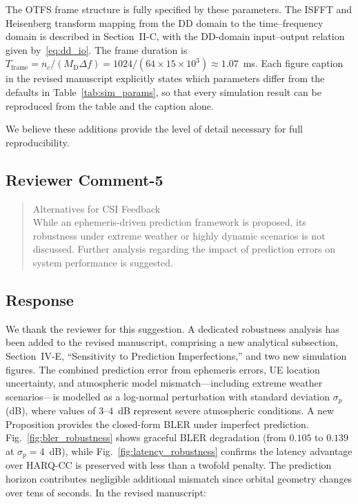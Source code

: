 The OTFS frame structure is fully specified by these parameters. The ISFFT and Heisenberg transform mapping from the DD domain to the time--frequency domain is described in Section~II-C, with the DD-domain input--output relation given by~\eqref{eq:dd_io}. The frame duration is $T_{\mathrm{frame}} = n_c / (M_{\mathrm{D}} \Delta f) = 1024 / (64 \times 15 \times 10^3) \approx 1.07$~ms. Each figure caption in the revised manuscript explicitly states which parameters differ from the defaults in Table~\ref{tab:sim_params}, so that every simulation result can be reproduced from the table and the caption alone.

We believe these additions provide the level of detail necessary for full reproducibility.

\subsection{Reviewer Comment-5}



\begin{mdframed}
\begin{quote}
Alternatives for CSI Feedback \\
   While an ephemeris-driven prediction framework is proposed, its robustness under extreme weather or highly dynamic scenarios is not discussed. Further analysis regarding the impact of prediction errors on system performance is suggested.



\end{quote}

\end{mdframed}


\subsection{Response}

We thank the reviewer for this suggestion. A dedicated robustness analysis has been added to the revised manuscript, comprising a new analytical subsection, Section~IV-E, ``Sensitivity to Prediction Imperfections,'' and two new simulation figures. The combined prediction error from ephemeris errors, UE location uncertainty, and atmospheric model mismatch---including extreme weather scenarios---is modelled as a log-normal perturbation with standard deviation $\sigma_p$ (dB), where values of $3$--$4$~dB represent severe atmospheric conditions. A new Proposition provides the closed-form BLER under imperfect prediction. Fig.~\ref{fig:bler_robustness} shows graceful BLER degradation (from $0.105$ to $0.139$ at $\sigma_p = 4$~dB), while Fig.~\ref{fig:latency_robustness} confirms the latency advantage over HARQ-CC is preserved with less than a twofold penalty. The prediction horizon contributes negligible additional mismatch since orbital geometry changes over tens of seconds. In the revised manuscript:

